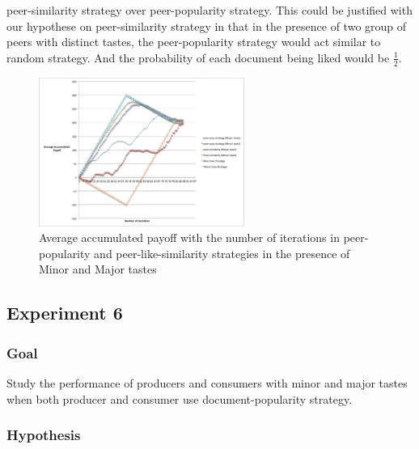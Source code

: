 \documentclass [12pt]{article} \usepackage{multicol}
\begin{document}
peer-similarity strategy over peer-popularity strategy. 
This could be justified with our hypothese on peer-similarity strategy in that in the presence of two
group of peers with distinct tastes, the peer-popularity strategy would act similar to random strategy. And the probability
of each document being liked would be $\frac{1}{2}$.  


\begin{figure}[h!]
\begin{center}
\includegraphics[width=0.6\textwidth,center]{images/Exp4-peer-pop-and-peer-sim-MajorMinor}
\caption{Average accumulated payoff with the number of iterations in peer-popularity and peer-like-similarity strategies in the presence of Minor and 
Major tastes}
\label{fig:images/EXP3-2}
\end{center}
\end{figure}

\subsection{Experiment 6}
\subsubsection{Goal}
Study the performance of producers and consumers with minor and major tastes when both producer and consumer use document-popularity strategy.
\subsubsection{Hypothesis}
\end{document}
